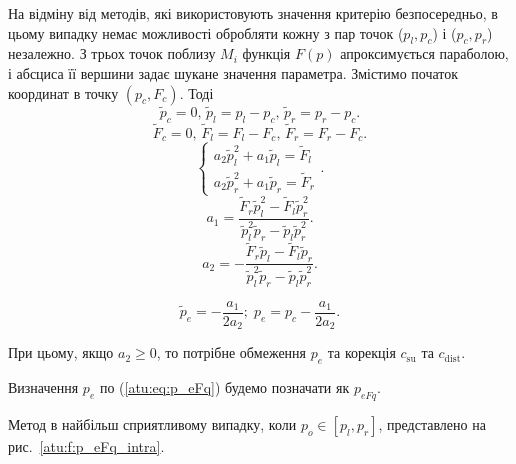 \documentclass[a4paper,13pt]{atuaref}
\begin{document}
На відміну від методів, які використовують значення критерію безпосередньо, в
цьому випадку немає можливості обробляти кожну з пар точок ($ p_l, p_c $) і
($p_c, p_r $) незалежно. З трьох точок поблизу $ M_ {i} $ функція $ F (p) $
апроксимується параболою, і абсциса її вершини задає шукане значення параметра.
Змістимо початок координат в точку
$ ( p_c, F_c ) $. Тоді
%
\[
  \tilde{p}_c = 0, \,
  \tilde{p}_l = p_l - p_c, \,
  \tilde{p}_r = p_r - p_c.
\]
%
\[
  \tilde{F}_c = 0, \,
  \tilde{F}_l = F_l - F_c, \,
  \tilde{F}_r = F_r - F_c.
\]
%
\[
  \left\{
    \begin{array}{l}
      a_2 \tilde{p}_l^2 + a_1 \tilde{p}_l  = \tilde{F}_l
      \\
      a_2 \tilde{p}_r^2 + a_1 \tilde{p}_r  = \tilde{F}_r
    \end{array}
  \right. .
\]
%
\[
  a_1 = \frac{\tilde{F}_r \tilde{p}_l^2 - \tilde{F}_l \tilde{p}_r^2 }
             { \tilde{p}_l^2 \tilde{p}_r  - \tilde{p}_l \tilde{p}_r^2 }.
\]
%
\[
  a_2 = - \frac{\tilde{F}_r \tilde{p}_l - \tilde{F}_l \tilde{p}_r }
               { \tilde{p}_l^2 \tilde{p}_r  - \tilde{p}_l \tilde{p}_r^2 }.
\]

\begin{equation}
  \tilde{p}_e = - \frac{a_1}{2 a_2};
  \;
  p_e = p_c - \frac{a_1}{2 a_2}.
  \label{atu:eq:p_eFq}
\end{equation}

При цьому, якщо
$ a_2 \ge 0 $,
то потрібне обмеження $p_e$ та корекція $c_\mathrm{su}$ та $c_\mathrm{dist}$.

Визначення $ p_e $ по (\ref{atu:eq:p_eFq}) будемо позначати як $p_{eFq}$.

Метод в найбільш сприятливому випадку, коли
$p_o \in [p_l,p_r]$, представлено на рис.~\ref{atu:f:p_eFq_intra}.
\end{document}
